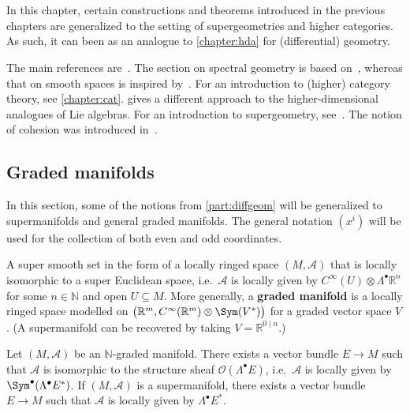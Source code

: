 \chapter{}\label{chapter:hdg}

    In this chapter, certain constructions and theorems introduced in the previous chapters are generalized to the setting of supergeometries and higher categories. As such, it can been as an analogue to \cref{chapter:hda} for (differential) geometry.

    The main references are~\citet{schreiber_loop_2005,baez_higher_2005}. The section on spectral geometry is based on~\citet{sanders_commutative_2012}, whereas that on smooth spaces is inspired by~\citet{baez_convenient_2011}. For an introduction to (higher) category theory, see \cref{chapter:cat}.  gives a different approach to the higher-dimensional analogues of Lie algebras. For an introduction to supergeometry, see~\citet{cattaneo_introduction_2011}. The notion of cohesion was introduced in~\citet{lawvere_cohesive_1994}.


    \minitoc

\section{Graded manifolds}

    In this section, some of the notions from \cref{part:diffgeom} will be generalized to supermanifolds and general graded manifolds. The general notation $(x^i)$ will be used for the collection of both even and odd coordinates.

    \begin{example}[Supermanifold]\label{hdg:supermanifold}
        A super smooth set in the form of a locally ringed space $(M,\mathcal{A})$ that is locally isomorphic to a super Euclidean space, i.e.~$\mathcal{A}$ is locally given by $C^\infty(U)\otimes\Lambda^\bullet\mathbb{R}^n$ for some $n\in\mathbb{N}$ and open $U\subseteq M$. More generally, a \textbf{graded manifold} is a locally ringed space modelled on $\bigl(\mathbb{R}^m,C^\infty(\mathbb{R}^m)\otimes\Sym(V^*)\bigr)$ for a graded vector space $V$. (A supermanifold can be recovered by taking $V=\mathbb{R}^{0\mid n}$.)
    \end{example}

    \begin{theorem}[Batchelor]
        Let $(M,\mathcal{A})$ be an $\mathbb{N}$-graded manifold. There exists a vector bundle $E\rightarrow M$ such that $\mathcal{A}$ is isomorphic to the structure sheaf $\mathcal{O}(\Lambda^\bullet E)$, i.e.~$\mathcal{A}$ is locally given by $\Sym^\bullet(\Lambda^\bullet E^*)$. If $(M,\mathcal{A})$ is a supermanifold, there exists a vector bundle $E\rightarrow M$ such that $\mathcal{A}$ is locally given by $\Lambda^\bullet E^*$.
    \end{theorem}

